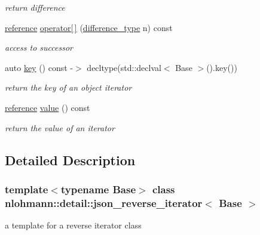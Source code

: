 \begin{DoxyCompactItemize}
\begin{DoxyCompactList}\small\item\em return difference \end{DoxyCompactList}\item 
\mbox{\hyperlink{classnlohmann_1_1detail_1_1json__reverse__iterator_a42f51a69bac7b2aebb613b2164e457f1}{reference}} \mbox{\hyperlink{classnlohmann_1_1detail_1_1json__reverse__iterator_a8ed9e445e03c49c46612eb7f7d55bb61}{operator\mbox{[}$\,$\mbox{]}}} (\mbox{\hyperlink{classnlohmann_1_1detail_1_1json__reverse__iterator_a9ab55987c05ec6427ad36082e351cc45}{difference\+\_\+type}} n) const
\begin{DoxyCompactList}\small\item\em access to successor \end{DoxyCompactList}\item 
auto \mbox{\hyperlink{classnlohmann_1_1detail_1_1json__reverse__iterator_adc648a641e8e9a1072c5abd56ad06401}{key}} () const -\/$>$ decltype(std\+::declval$<$ Base $>$().key())
\begin{DoxyCompactList}\small\item\em return the key of an object iterator \end{DoxyCompactList}\item 
\mbox{\hyperlink{classnlohmann_1_1detail_1_1json__reverse__iterator_a42f51a69bac7b2aebb613b2164e457f1}{reference}} \mbox{\hyperlink{classnlohmann_1_1detail_1_1json__reverse__iterator_ae22803d442d483041d17239615f83b58}{value}} () const
\begin{DoxyCompactList}\small\item\em return the value of an iterator \end{DoxyCompactList}\end{DoxyCompactItemize}


\subsection{Detailed Description}
\subsubsection*{template$<$typename Base$>$\newline
class nlohmann\+::detail\+::json\+\_\+reverse\+\_\+iterator$<$ Base $>$}

a template for a reverse iterator class 


